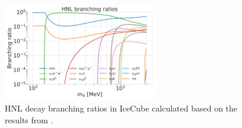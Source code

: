 \documentclass[a4paper,11pt]{article}
\begin{document}
\begin{figure}
  \includegraphics[width=0.6\textwidth]{figures/branching_ratios_log_up_to_2GeV.png}
  \caption{HNL decay branching ratios in IceCube calculated based on the results from \cite{Coloma:2020lgy}.}
  \label{fig:hnl_branching_ratios}
\end{figure}
\end{document}
